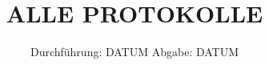 

\subject{Alles}
\title{ALLE PROTOKOLLE}
\date{%
  Durchführung: DATUM
  \hspace{3em}
  Abgabe: DATUM
}



\maketitle
\thispagestyle{empty}
\tableofcontents
\newpage

\printbibliography{}


